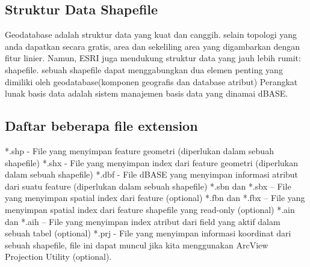 \subsection{Struktur Data Shapefile}
Geodatabase adalah struktur data yang kuat dan canggih. selain topologi yang anda dapatkan secara 
gratis, area dan sekeliling area yang digambarkan dengan fitur linier. Namun, ESRI juga mendukung 
struktur data yang jauh lebih rumit: shapefile. sebuah shapefile dapat menggabungkan dua elemen 
penting yang dimiliki oleh geodatabase(komponen geografis dan database atribut) Perangkat lunak 
basis data adalah sistem manajemen basis data yang dinamai dBASE. 

\subsection{Daftar beberapa file extension}
*.shp - File yang menyimpan feature geometri (diperlukan dalam sebuah shapefile) 
*.shx - File yang menyimpan index dari feature geometri (diperlukan dalam sebuah shapefile) 
*.dbf - File dBASE yang menyimpan informasi atribut dari suatu feature (diperlukan dalam sebuah shapefile) 
*.sbn dan *.sbx – File yang menyimpan spatial index dari feature (optional) 
*.fbn dan *.fbx – File yang menyimpan spatial index dari feature shapefile yang read-only (optional) 
*.ain dan *.aih – File yang menyimpan index atribut dari field yang aktif dalam sebuah tabel (optional) 
*.prj - File yang menyimpan informasi koordinat dari sebuah shapefile, file ini dapat muncul jika kita menggunakan ArcView Projection Utility (optional).
